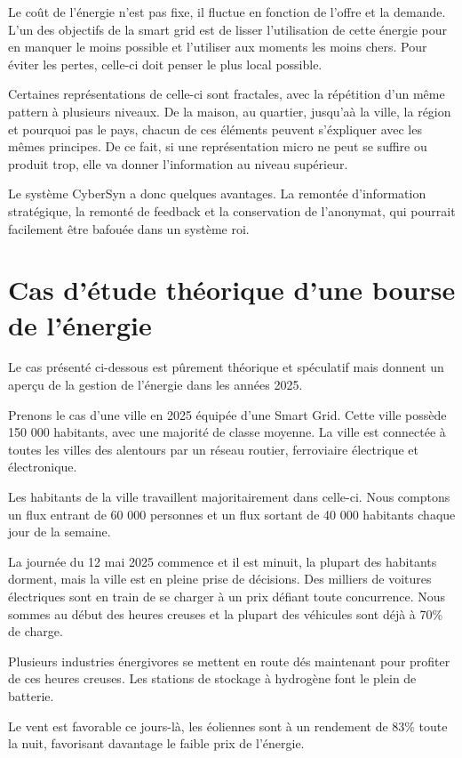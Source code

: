 Le coût de l'énergie n'est pas fixe, il fluctue en fonction de l'offre et la demande.
L'un des objectifs de la smart grid est de lisser l'utilisation de cette énergie pour
en manquer le moins possible et l'utiliser aux moments les moins chers. Pour éviter les pertes,
celle-ci doit penser le plus local possible.

Certaines représentations de celle-ci sont fractales, avec la répétition d'un même pattern à
plusieurs niveaux.
De la maison, au quartier, jusqu'aà la ville, la région et pourquoi pas le pays, chacun de
ces éléments peuvent s'éxpliquer avec les mêmes principes.
De ce fait, si une représentation micro ne peut se suffire ou produit trop, elle va donner l'information
au niveau supérieur.

Le système CyberSyn a donc quelques avantages.
La remontée d'information stratégique, la remonté de feedback et la conservation de l'anonymat,
qui pourrait facilement être bafouée dans un système roi.

\section{Cas d'étude théorique d'une bourse de l'énergie}

Le cas présenté ci-dessous est pûrement théorique et spéculatif mais donnent un aperçu de
la gestion de l'énergie dans les années 2025.

Prenons le cas d'une ville en 2025 équipée d'une Smart Grid.
Cette ville possède 150 000 habitants, avec une majorité de classe moyenne.
La ville est connectée à toutes les villes des alentours par un réseau routier, ferroviaire
électrique et électronique.

Les habitants de la ville travaillent majoritairement dans celle-ci.
Nous comptons un flux entrant de 60 000 personnes et un flux sortant de 40 000 habitants chaque jour
de la semaine.

La journée du 12 mai 2025 commence et il est minuit, la plupart des habitants dorment, mais
la ville est en pleine prise de décisions.
Des milliers de voitures électriques sont en train de se charger à un prix défiant toute concurrence.
Nous sommes au début des heures creuses et la plupart des véhicules sont déjà à 70\% de charge.

Plusieurs industries énergivores se mettent en route dés maintenant pour profiter de ces heures creuses.
Les stations de stockage à hydrogène font le plein de batterie.

Le vent est favorable ce jours-là, les éoliennes sont à un rendement de 83\% toute la nuit,
favorisant davantage le faible prix de l'énergie.

